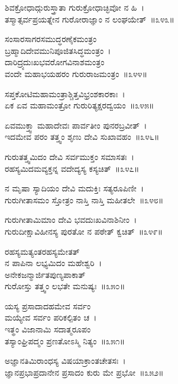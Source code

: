 ಶಿವಕ್ರೋಧಾದ್ಗುರುಸ್ತ್ರಾತಾ ಗುರುಕ್ರೋಧಾಚ್ಛಿವೋ ನ ಹಿ~।\\
ತಸ್ಮಾತ್ಸರ್ವಪ್ರಯತ್ನೇನ ಗುರೋರಾಜ್ಞಾಂ ನ ಲಂಘಯೇತ್~॥೩೪೩॥

ಸಂಸಾರಸಾಗರಸಮುದ್ಧರಣೈಕಮಂತ್ರಂ \\ಬ್ರಹ್ಮಾದಿದೇವಮುನಿಪೂಜಿತಸಿದ್ಧಮಂತ್ರಂ~।\\
ದಾರಿದ್ರ್ಯದುಃಖಭವರೋಗವಿನಾಶಮಂತ್ರಂ \\ವಂದೇ ಮಹಾಭಯಹರಂ ಗುರುರಾಜಮಂತ್ರಂ~॥೩೪೪॥

ಸಪ್ತಕೋಟಿಮಹಾಮಂತ್ರಾಶ್ಚಿತ್ತವಿಭ್ರಂಶಕಾರಕಾಃ~।\\
ಏಕ ಏವ ಮಹಾಮಂತ್ರೋ ಗುರುರಿತ್ಯಕ್ಷರದ್ವಯಂ~॥೩೪೫॥

ಏವಮುಕ್ತ್ವಾ ಮಹಾದೇವಃ ಪಾರ್ವತೀಂ ಪುನರಬ್ರವೀತ್~।\\
ಇದಮೇವ ಪರಂ ತತ್ತ್ವಂ ಶೃಣು ದೇವಿ ಸುಖಾವಹಂ~॥೩೪೬॥

ಗುರುತತ್ತ್ವಮಿದಂ ದೇವಿ ಸರ್ವಮುಕ್ತಂ ಸಮಾಸತಃ~।\\
ರಹಸ್ಯಮಿದಮವ್ಯಕ್ತನ್ನ ವದೇದ್ಯಸ್ಯ ಕಸ್ಯಚಿತ್~॥೩೪೭॥

ನ ಮೃಷಾ ಸ್ಯಾದಿಯಂ ದೇವಿ ಮದುಕ್ತಿಃ ಸತ್ಯರೂಪಿಣೀ~।\\
ಗುರುಗೀತಾಸಮಂ ಸ್ತೋತ್ರಂ ನಾಸ್ತಿ ನಾಸ್ತಿ ಮಹೀತಲೇ~॥೩೪೮॥

ಗುರುಗೀತಾಮಿಮಾಂ ದೇವಿ ಭವದುಃಖವಿನಾಶಿನೀಂ~।\\
ಗುರುದೀಕ್ಷಾವಿಹೀನಸ್ಯ ಪುರತೋ ನ ಪಠೇತ್ ಕ್ವಚಿತ್~॥೩೪೯॥

ರಹಸ್ಯಮತ್ಯಂತರಹಸ್ಯಮೇತತ್ \\ನ ಪಾಪಿನಾ ಲಭ್ಯಮಿದಂ ಮಹೇಶ್ವರಿ~।\\
ಅನೇಕಜನ್ಮಾರ್ಜಿತಪುಣ್ಯಪಾಕಾತ್ \\ಗುರೋಸ್ತು ತತ್ತ್ವಂ ಲಭತೇ ಮನುಷ್ಯಃ~॥೩೫೦॥

ಯಸ್ಯ ಪ್ರಸಾದಾದಹಮೇವ ಸರ್ವಂ\\ ಮಯ್ಯೇವ ಸರ್ವಂ ಪರಿಕಲ್ಪಿತಂ ಚ~।\\
ಇತ್ಥಂ ವಿಜಾನಾಮಿ ಸದಾತ್ಮರೂಪಂ \\ತಸ್ಯಾಂಘ್ರಿಪದ್ಮಂ ಪ್ರಣತೋಽಸ್ಮಿ ನಿತ್ಯಂ~॥೩೫೧॥

ಅಜ್ಞಾನತಿಮಿರಾಂಧಸ್ಯ ವಿಷಯಾಕ್ರಾಂತಚೇತಸಃ~।\\
ಜ್ಞಾನಪ್ರಭಾಪ್ರದಾನೇನ ಪ್ರಸಾದಂ ಕುರು ಮೇ ಪ್ರಭೋ~॥೩೫೨॥

